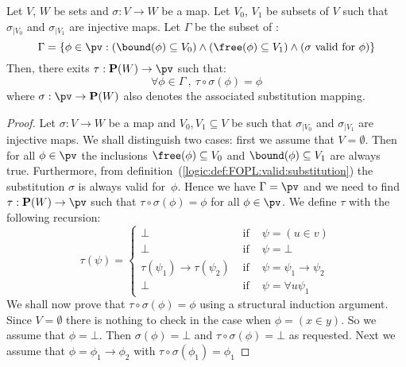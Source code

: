 \begin{theorem}\label{logic:the:FOPL:localinv:main}
Let $V$, $W$ be sets and $\sigma:V\to W$ be a map. Let $V_{0}$,
$V_{1}$ be subsets of $V$ such that $\sigma_{|V_{0}}$ and
$\sigma_{|V_{1}}$ are injective maps. Let $\Gamma$ be the subset of
\pv:
    \[
        \Gamma = 
            \{ \phi\in\pv:
                (\bound(\phi)\subseteq V_{0})\land
                (\free(\phi)\subseteq V_{1}) \land
                (\mbox{$\sigma$ valid for $\phi$})
            \}
    \]
Then, there exits $\tau:{\bf P}(W)\to\pv$ such that:
    \[
    \forall\phi\in\Gamma\ ,\ \tau\circ\sigma(\phi)=\phi
    \]
where $\sigma:\pv\to{\bf P}(W)$ also denotes the associated
substitution mapping.
\end{theorem}
\begin{proof}
Let $\sigma:V\to W$ be a map and $V_{0},V_{1}\subseteq V$ be such
that $\sigma_{|V_{0}}$ and $\sigma_{|V_{1}}$ are injective maps. We
shall distinguish two cases: first we assume that $V=\emptyset$.
Then for all $\phi\in\pv$ the inclusions $\free(\phi)\subseteq
V_{0}$ and $\bound(\phi)\subseteq V_{1}$ are always true.
Furthermore, from
definition~(\ref{logic:def:FOPL:valid:substitution}) the
substitution $\sigma$ is always valid for~$\phi$. Hence we have
$\Gamma=\pv$ and we need to find $\tau:{\bf P}(W)\to\pv$ such that
$\tau\circ\sigma(\phi)=\phi$ for all $\phi\in\pv$. We define $\tau$
with the following recursion:
    \begin{equation}\label{logic:eqn:FOPL:localinv:the:1}
                    \tau(\psi)=\left\{
                    \begin{array}{lcl}
                    \bot&\mbox{\ if\ }&\psi=(u\in v)\\
                    \bot&\mbox{\ if\ }&\psi=\bot\\
                    \tau(\psi_{1})\to\tau(\psi_{2})
                    &\mbox{\ if\ }&\psi=\psi_{1}\to\psi_{2}\\
                    \bot&
                    \mbox{\ if\ }&\psi=\forall u\psi_{1}
                    \end{array}\right.
    \end{equation}
We shall now prove that $\tau\circ\sigma(\phi)=\phi$ using a
structural induction argument.  Since $V=\emptyset$ there is nothing
to check in the case when $\phi=(x\in y)$. So we assume that
$\phi=\bot$. Then $\sigma(\phi)=\bot$ and
$\tau\circ\sigma(\phi)=\bot$ as requested. Next we assume that
$\phi=\phi_{1}\to\phi_{2}$ with $\tau\circ\sigma(\phi_{1})=\phi_{1}$

\end{proof}
